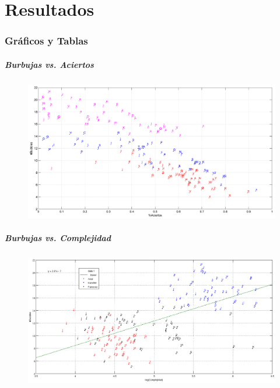 \documentclass[10pt]{beamer}
\begin{document}
\part{Resultados}
  \frame{\partpage}
  \section{Gr\'aficos y Tablas}
 	\begin{frame}
	\frametitle{Burbujas vs. Aciertos}
	    \begin{figure}
		\includegraphics[width=\textwidth]{graficos/bubblesVsAciertos_Fiables.png}
	    \end{figure}
	\end{frame}

 	\begin{frame}
	\frametitle{Burbujas vs. Complejidad}
	    \begin{figure}
		\includegraphics[width=\textwidth]{graficos/bubblesVsLogComplejidad_Fiables.png}
	    \end{figure}
	\end{frame}
\end{document}
